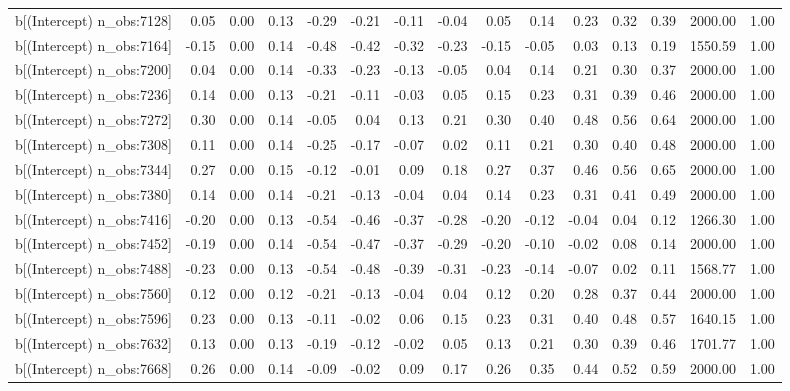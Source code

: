 \begin{table}[ht]
\begin{tabular}{rrrrrrrrrrrrrrr}
  b[(Intercept) n\_obs:7128] & 0.05 & 0.00 & 0.13 & -0.29 & -0.21 & -0.11 & -0.04 & 0.05 & 0.14 & 0.23 & 0.32 & 0.39 & 2000.00 & 1.00 \\ 
  b[(Intercept) n\_obs:7164] & -0.15 & 0.00 & 0.14 & -0.48 & -0.42 & -0.32 & -0.23 & -0.15 & -0.05 & 0.03 & 0.13 & 0.19 & 1550.59 & 1.00 \\ 
  b[(Intercept) n\_obs:7200] & 0.04 & 0.00 & 0.14 & -0.33 & -0.23 & -0.13 & -0.05 & 0.04 & 0.14 & 0.21 & 0.30 & 0.37 & 2000.00 & 1.00 \\ 
  b[(Intercept) n\_obs:7236] & 0.14 & 0.00 & 0.13 & -0.21 & -0.11 & -0.03 & 0.05 & 0.15 & 0.23 & 0.31 & 0.39 & 0.46 & 2000.00 & 1.00 \\ 
  b[(Intercept) n\_obs:7272] & 0.30 & 0.00 & 0.14 & -0.05 & 0.04 & 0.13 & 0.21 & 0.30 & 0.40 & 0.48 & 0.56 & 0.64 & 2000.00 & 1.00 \\ 
  b[(Intercept) n\_obs:7308] & 0.11 & 0.00 & 0.14 & -0.25 & -0.17 & -0.07 & 0.02 & 0.11 & 0.21 & 0.30 & 0.40 & 0.48 & 2000.00 & 1.00 \\ 
  b[(Intercept) n\_obs:7344] & 0.27 & 0.00 & 0.15 & -0.12 & -0.01 & 0.09 & 0.18 & 0.27 & 0.37 & 0.46 & 0.56 & 0.65 & 2000.00 & 1.00 \\ 
  b[(Intercept) n\_obs:7380] & 0.14 & 0.00 & 0.14 & -0.21 & -0.13 & -0.04 & 0.04 & 0.14 & 0.23 & 0.31 & 0.41 & 0.49 & 2000.00 & 1.00 \\ 
  b[(Intercept) n\_obs:7416] & -0.20 & 0.00 & 0.13 & -0.54 & -0.46 & -0.37 & -0.28 & -0.20 & -0.12 & -0.04 & 0.04 & 0.12 & 1266.30 & 1.00 \\ 
  b[(Intercept) n\_obs:7452] & -0.19 & 0.00 & 0.14 & -0.54 & -0.47 & -0.37 & -0.29 & -0.20 & -0.10 & -0.02 & 0.08 & 0.14 & 2000.00 & 1.00 \\ 
  b[(Intercept) n\_obs:7488] & -0.23 & 0.00 & 0.13 & -0.54 & -0.48 & -0.39 & -0.31 & -0.23 & -0.14 & -0.07 & 0.02 & 0.11 & 1568.77 & 1.00 \\ 
  b[(Intercept) n\_obs:7560] & 0.12 & 0.00 & 0.12 & -0.21 & -0.13 & -0.04 & 0.04 & 0.12 & 0.20 & 0.28 & 0.37 & 0.44 & 2000.00 & 1.00 \\ 
  b[(Intercept) n\_obs:7596] & 0.23 & 0.00 & 0.13 & -0.11 & -0.02 & 0.06 & 0.15 & 0.23 & 0.31 & 0.40 & 0.48 & 0.57 & 1640.15 & 1.00 \\ 
  b[(Intercept) n\_obs:7632] & 0.13 & 0.00 & 0.13 & -0.19 & -0.12 & -0.02 & 0.05 & 0.13 & 0.21 & 0.30 & 0.39 & 0.46 & 1701.77 & 1.00 \\ 
  b[(Intercept) n\_obs:7668] & 0.26 & 0.00 & 0.14 & -0.09 & -0.02 & 0.09 & 0.17 & 0.26 & 0.35 & 0.44 & 0.52 & 0.59 & 2000.00 & 1.00 \\ 

\end{tabular}
\end{table}
